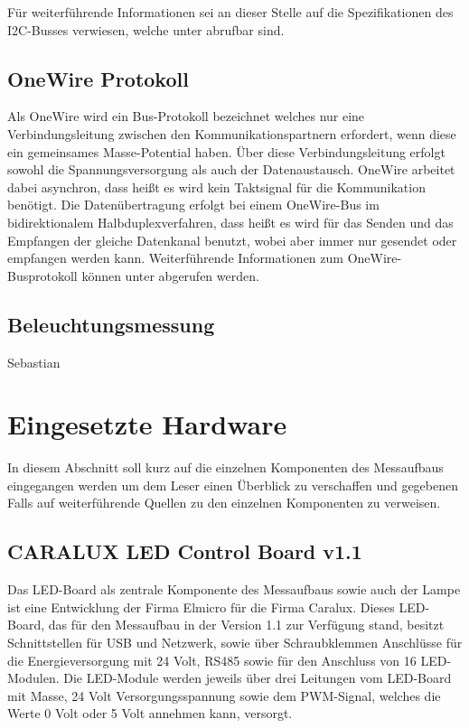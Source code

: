 \documentclass[a4paper,12pt]{scrartcl}
\begin{document}
F\"ur weiterf\"uhrende Informationen sei an dieser Stelle auf die Spezifikationen des I2C-Busses verwiesen, welche unter \cite{speci2c} abrufbar
sind.

\subsection{OneWire Protokoll}
Als OneWire wird ein Bus-Protokoll bezeichnet welches nur eine Verbindungsleitung zwischen den Kommunikationspartnern erfordert, wenn diese ein gemeinsames
Masse-Potential haben. \"Uber diese Verbindungsleitung erfolgt sowohl die Spannungsversorgung als auch der Datenaustausch. OneWire arbeitet dabei asynchron,
dass hei\ss{}t es wird kein Taktsignal f\"ur die Kommunikation ben\"otigt. Die Daten\"ubertragung erfolgt bei einem OneWire-Bus im bidirektionalem
Halbduplexverfahren, dass hei\ss{}t es wird f\"ur das Senden und das Empfangen der gleiche Datenkanal benutzt, wobei aber immer nur gesendet oder empfangen
werden kann. Weiterf\"uhrende Informationen zum OneWire-Busprotokoll k\"onnen unter \cite{spec1wire} abgerufen werden.

\subsection{Beleuchtungsmessung}
Sebastian

\section{Eingesetzte Hardware}
In diesem Abschnitt soll kurz auf die einzelnen Komponenten des Messaufbaus eingegangen werden um dem Leser einen Überblick zu verschaffen und gegebenen Falls
auf weiterführende Quellen zu den einzelnen Komponenten zu verweisen.

\subsection{CARALUX LED Control Board v1.1}

Das LED-Board als zentrale Komponente des Messaufbaus sowie auch der Lampe ist eine Entwicklung der Firma Elmicro für die Firma Caralux. Dieses LED-Board, das
für den Messaufbau in der Version 1.1 zur Verfügung stand, besitzt Schnittstellen für USB und Netzwerk, sowie über Schraubklemmen Anschlüsse für die
Energieversorgung mit 24 Volt, RS485 sowie für den Anschluss von 16 LED-Modulen. Die LED-Module werden jeweils über drei Leitungen vom LED-Board mit Masse, 24
Volt Versorgungsspannung sowie dem PWM-Signal, welches die Werte 0 Volt oder 5 Volt annehmen kann, versorgt.
\end{document}
